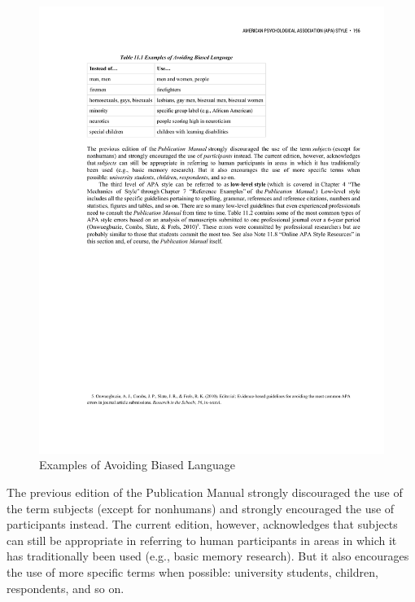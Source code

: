 \begin{figure}

\includegraphics[width=\linewidth]{figures/C11biased.pdf}
\caption{Examples of Avoiding Biased Language}
\label{fig:biased}
\end{figure}

The previous edition of the Publication Manual strongly discouraged the use of the term subjects (except for nonhumans) and strongly encouraged the use of participants instead. The current edition, however, acknowledges that subjects can still be appropriate in referring to human participants in areas in which it has traditionally been used (e.g., basic memory research). But it also encourages the use of more specific terms when possible: university students, children, respondents, and so on.


